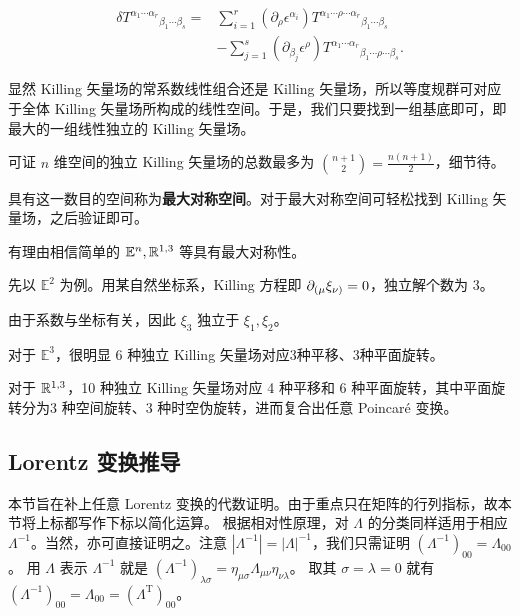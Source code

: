 \[
\begin{aligned}
\delta T^{\alpha_1\cdots\alpha_r}{}_{\beta_1\cdots\beta_s}
={}&
\sum_{i=1}^r
(\partial_\rho\epsilon^{\alpha_i})
T^{\alpha_1\cdots\rho\cdots\alpha_r}{}_{\beta_1\cdots\beta_s}\\
&-
\sum_{j=1}^s
(\partial_{\beta_j}\epsilon^\rho)
T^{\alpha_1\cdots\alpha_r}{}_{\beta_1\cdots\rho\cdots\beta_s}.
\end{aligned}
\]

显然 Killing 矢量场的常系数线性组合还是 Killing 矢量场，所以等度规群可对应于全体 Killing 矢量场所构成的线性空间。于是，我们只要找到一组基底即可，即最大的一组线性独立的 Killing 矢量场。

可证 $n$ 维空间的独立 Killing 矢量场的总数最多为 $\binom{n+1}{2}=\frac{n(n+1)}2$，细节待。

具有这一数目的空间称为\textbf{最大对称空间}。对于最大对称空间可轻松找到 Killing 矢量场，之后验证即可。

有理由相信简单的 $\mathbb{E}^n, \mathbb{R}^{1,3}$ 等具有最大对称性。

先以 $\mathbb{E}^2$ 为例。用某自然坐标系，Killing 方程即 $\partial_{(\mu}\xi_{\nu)}=0$，独立解个数为 3。

由于系数与坐标有关，因此 $\xi_3$ 独立于 $\xi_1,\xi_2$。

对于 $\mathbb E^3$，很明显 6 种独立 Killing 矢量场对应3种平移、3种平面旋转。

对于 $\mathbb{R}^{1,3}$，10 种独立 Killing 矢量场对应 4 种平移和 6 种平面旋转，其中平面旋转分为3 种空间旋转、3 种时空伪旋转，进而复合出任意 Poincaré 变换。


\subsection{Lorentz 变换推导}\label{sec:PoincareLorentz}

    本节旨在补上任意 Lorentz 变换的代数证明。由于重点只在矩阵的行列指标，故本节将上标都写作下标以简化运算。
根据相对性原理，对 $\Lambda$ 的分类同样适用于相应 $\Lambda^{-1}$。当然，亦可直接证明之。注意 $|\Lambda^{-1}|=|\Lambda|^{-1}$，我们只需证明 $(\Lambda^{-1})_{00}=\Lambda_{00}$。
用 $\Lambda$ 表示 $\Lambda^{-1}$ 就是 $(\Lambda^{-1})_{\lambda\sigma}=\eta_{\mu\sigma}\Lambda_{\mu\nu}\eta_{\nu\lambda}$。
取其 $\sigma=\lambda=0$ 就有 $(\Lambda^{-1})_{00}=\Lambda_{00}=(\Lambda^\mathrm{T})_{00}$。



